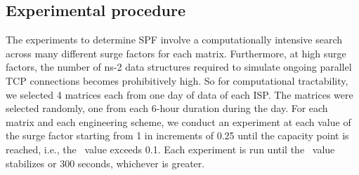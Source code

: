 





\subsection{Experimental procedure}


The experiments to determine SPF involve a computationally intensive search across many different surge factors for each matrix. Furthermore, at high surge factors, the number of ns-2 data structures required to simulate ongoing parallel TCP connections becomes prohibitively high. So for computational tractability, we selected 4 matrices each from one day of data of each ISP. The matrices were selected randomly, one from each 6-hour duration during the day.  For each matrix and each engineering scheme, we conduct an experiment at each value of the surge factor starting from 1 in increments of 0.25 until the capacity point is reached, i.e., the \maxiodiff\ value exceeds 0.1. Each experiment is run until the \maxiodiff\ value stabilizes or 300 seconds, whichever is greater. 


